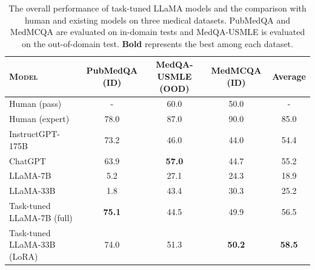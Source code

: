 \documentclass[11pt]{article}
\begin{document}
\begin{table}[t]
\centering
\footnotesize
\begin{tabular}{l|c|c|c|c}
\toprule
\textsc{Model} & PubMedQA (ID) & MedQA-USMLE (OOD) & MedMCQA (ID) & Average \\
\midrule
Human (pass) & - & 60.0 & 50.0 & - \\
Human (expert) & 78.0 & 87.0 & 90.0 & 85.0 \\
\midrule
InstructGPT-175B & 73.2 & 46.0 & 44.0 & 54.4 \\
ChatGPT & 63.9 & \textbf{57.0} & 44.7 & 55.2 \\
LLaMA-7B & 5.2 & 27.1 & 24.3 & 18.9 \\
LLaMA-33B & 1.8 & 43.4 & 30.3 & 25.2 \\
\midrule
Task-tuned LLaMA-7B (full) & \textbf{75.1} & 44.5 & 49.9 & 56.5 \\
Task-tuned LLaMA-33B (LoRA) & 74.0 & 51.3 & \textbf{50.2} & \textbf{58.5} \\
\bottomrule
\end{tabular}
\caption{
The overall performance of task-tuned LLaMA models and the comparison with human and existing models on three medical datasets.
PubMedQA and MedMCQA are evaluated on in-domain tests and MedQA-USMLE is evaluated on the out-of-domain test.
\textbf{Bold} represents the best among each dataset.
}
\label{tab:medical_qa}
\end{table}
\end{document}
